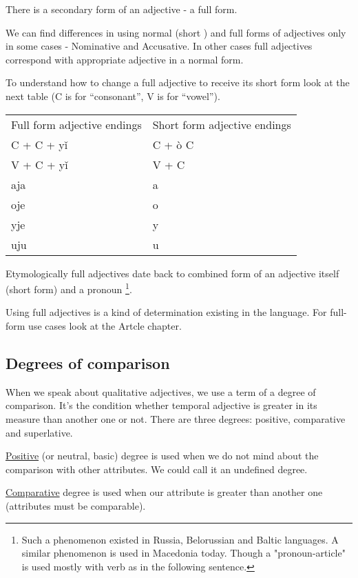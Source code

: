 There is a secondary form of an adjective - a full form.

We can find differences in using normal (short ) and full forms of adjectives only in some cases - Nominative and Accusative. In other cases full adjectives correspond with appropriate adjective in a normal form.

To understand how to change a full adjective to receive its short form look at the next table (C is for “consonant”, V is for “vowel”).

\begin{table}
	\begin{tabular}{ll}
		Full form adjective endings & Short form adjective endings \\
		C + C + yǐ & C + ò C \\
	    V + C + yǐ & V + C \\
		aja & a \\
		oje  & o \\
		yje & y \\
		uju & u \\
	\end{tabular}
\end{table}

Etymologically full adjectives date back to combined form of an adjective itself (short form) and a pronoun \footnote{Such a phenomenon existed in Russia, Belorussian and Baltic languages. A similar phenomenon is used in Macedonia today. Though a "pronoun-article" is used mostly with verb as in the following sentence.}. 

Using full adjectives is a kind of determination existing in the language. For full-form use cases look at the Artcle chapter.

\subsection{Degrees of comparison}

When we speak about qualitative adjectives, we use a term of a degree of comparison. It’s the condition whether temporal adjective is greater in its measure than another one or not. There are three degrees: positive, comparative and superlative.

\underline{Positive} (or neutral, basic) degree is used when we do not mind about the comparison with other attributes. We could call it an undefined degree.

\underline{Comparative} degree is used when our attribute is greater than another one (attributes must be comparable).  

